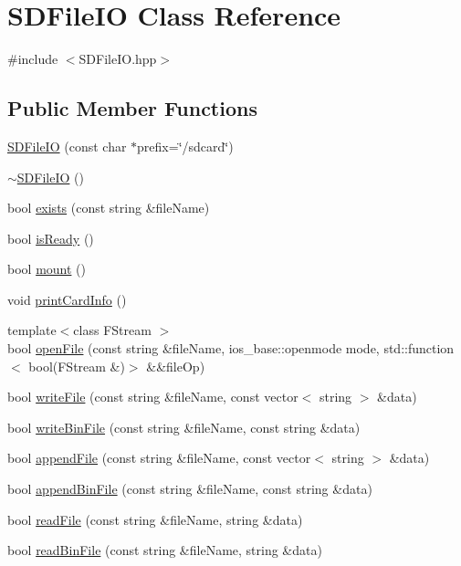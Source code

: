 \hypertarget{classSDFileIO}{}\section{S\+D\+File\+IO Class Reference}
\label{classSDFileIO}


{\ttfamily \#include $<$S\+D\+File\+I\+O.\+hpp$>$}

\subsection*{Public Member Functions}
\begin{DoxyCompactItemize}
\item 
\mbox{\hyperlink{classSDFileIO_aa278dc1e8f9e39a520b47c748fbfc254}{S\+D\+File\+IO}} (const char $\ast$prefix=\char`\"{}/sdcard\char`\"{})
\item 
\mbox{\hyperlink{classSDFileIO_a452951a64afa18614880d15e75b717db}{$\sim$\+S\+D\+File\+IO}} ()
\item 
bool \mbox{\hyperlink{classSDFileIO_a53a15061cca1e7a272fd606b88d43a2e}{exists}} (const string \&file\+Name)
\item 
bool \mbox{\hyperlink{classSDFileIO_a7d46ac6a2a1e9de575035bcd5f7b485a}{is\+Ready}} ()
\item 
bool \mbox{\hyperlink{classSDFileIO_af7e34f9012374dc9411cafa8a3ff4e50}{mount}} ()
\item 
void \mbox{\hyperlink{classSDFileIO_a7a2340367a4b95c94884be058ca0d063}{print\+Card\+Info}} ()
\item 
{\footnotesize template$<$class F\+Stream $>$ }\\bool \mbox{\hyperlink{classSDFileIO_a09eb67cb5d96201deaaefe38d04f17f3}{open\+File}} (const string \&file\+Name, ios\+\_\+base\+::openmode mode, std\+::function$<$ bool(F\+Stream \&)$>$ \&\&file\+Op)
\item 
bool \mbox{\hyperlink{classSDFileIO_a87a48c4dfedceff48a209e951f299ee9}{write\+File}} (const string \&file\+Name, const vector$<$ string $>$ \&data)
\item 
bool \mbox{\hyperlink{classSDFileIO_a03ad22388a4c6f3f8265dbc204947cfd}{write\+Bin\+File}} (const string \&file\+Name, const string \&data)
\item 
bool \mbox{\hyperlink{classSDFileIO_ab01f1777f4670c9cd4c04a0b3c6c2867}{append\+File}} (const string \&file\+Name, const vector$<$ string $>$ \&data)
\item 
bool \mbox{\hyperlink{classSDFileIO_ad03e7421e12132dea157e3e3844233a1}{append\+Bin\+File}} (const string \&file\+Name, const string \&data)
\item 
bool \mbox{\hyperlink{classSDFileIO_a572558952919c50968f9b0063220be6b}{read\+File}} (const string \&file\+Name, string \&data)
\item 
bool \mbox{\hyperlink{classSDFileIO_a5a06abe7718fa74b84fadad7650bfdad}{read\+Bin\+File}} (const string \&file\+Name, string \&data)
\end{DoxyCompactItemize}


